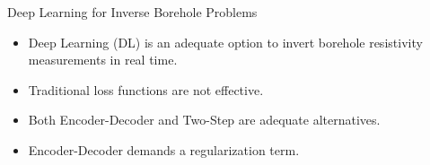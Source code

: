 \begin{frame}{Deep Learning for Inverse Borehole Problems}
\begin{itemize}
\item Deep Learning (DL) is an adequate option to invert borehole resistivity measurements in real time.
\vspace{0.5cm}
\item Traditional loss functions are not effective.
\vspace{0.5cm}
\item Both Encoder-Decoder and Two-Step are adequate alternatives.
\vspace{0.5cm}
\item Encoder-Decoder demands a regularization term.
\end{itemize}
\end{frame}